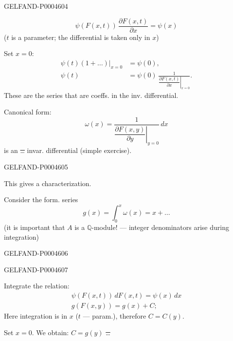 \begin{GelfandAdjacentEvidence}{GELFAND-P000460}{4}

\[
\psi(F(x,t))\,\frac{\partial F(x,t)}{\partial x}=\psi(x)
\]
($t$ is a parameter; the differential is taken only in $x$)

Set $x=0$:
\[
\begin{aligned}
\left.\psi(t)(1+\ldots)\right|_{x=0}&=\psi(0),\\
\psi(t)&=\psi(0)\,\frac{1}{\left.\dfrac{\partial F(x,t)}{\partial x}\right|_{x=0}}.
\end{aligned}
\]
These are the series that are coeffs. in the inv. differential.

Canonical form:
\[
\omega(x)=\frac{1}{\left.\dfrac{\partial F(x,y)}{\partial y}\right|_{y=0}}\,dx
\]
is an \sout{\ldots} invar. differential (simple exercise).
\end{GelfandAdjacentEvidence}
\begin{GelfandAdjacentEvidence}{GELFAND-P000460}{5}


This gives a characterization.

Consider the form. series
\[
g(x)=\int_0^x\omega(x)=x+\ldots
\]
(it is important that $A$ is a $\mathbb Q$-module! — integer denominators arise during integration)
\end{GelfandAdjacentEvidence}
\begin{GelfandAdjacentEvidence}{GELFAND-P000460}{6}

\end{GelfandAdjacentEvidence}
\begin{GelfandAdjacentEvidence}{GELFAND-P000460}{7}


Integrate the relation:
\[
\begin{gathered}
\psi(F(x,t))\,dF(x,t)=\psi(x)\,dx\\
g(F(x,y))=g(x)+C;
\end{gathered}
\]
Here integration is in $x$ ($t$ — param.), therefore $C=C(y)$.

Set $x=0$. We obtain: $C=g(y)$ \sout{\ldots}
\end{GelfandAdjacentEvidence}
